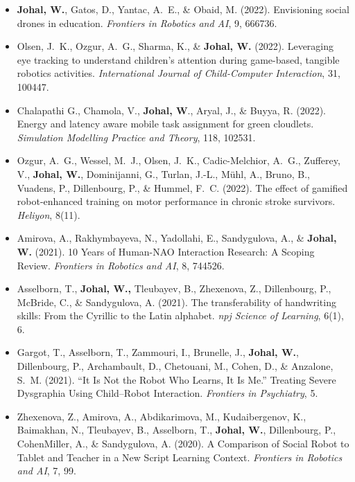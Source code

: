 \begin{itemize}[nosep]
    \item \textbf{Johal, W.}, Gatos, D., Yantac, A.\ E., \& Obaid, M. (2022). Envisioning social drones in education. \textit{Frontiers in Robotics and AI}, 9, 666736.

    \item Olsen, J.\ K., Ozgur, A.\ G., Sharma, K., \& \textbf{Johal, W.} (2022). Leveraging eye tracking to understand children's attention during game-based, tangible robotics activities. \textit{International Journal of Child-Computer Interaction}, 31, 100447.

    \item Chalapathi G., Chamola, V., \textbf{Johal, W}., Aryal, J., \& Buyya, R. (2022). Energy and latency aware mobile task assignment for green cloudlets. \textit{Simulation Modelling Practice and Theory}, 118, 102531.

    \item Ozgur, A.\ G., Wessel, M.\ J., Olsen, J.\ K., Cadic-Melchior, A.\ G., Zufferey, V., \textbf{Johal, W.}, Dominijanni, G., Turlan, J.-L., Mühl, A., Bruno, B., Vuadens, P., Dillenbourg, P., \& Hummel, F.\ C. (2022). The effect of gamified robot-enhanced training on motor performance in chronic stroke survivors. \textit{Heliyon}, 8(11).

    \item Amirova, A., Rakhymbayeva, N., Yadollahi, E., Sandygulova, A., \& \textbf{Johal, W.} (2021). 10 Years of Human-NAO Interaction Research: A Scoping Review. \textit{Frontiers in Robotics and AI}, 8, 744526.

    \item Asselborn, T., \textbf{Johal, W.,} Tleubayev, B., Zhexenova, Z., Dillenbourg, P., McBride, C., \& Sandygulova, A. (2021). The transferability of handwriting skills: From the Cyrillic to the Latin alphabet. \textit{npj Science of Learning}, 6(1), 6.

    \item Gargot, T., Asselborn, T., Zammouri, I., Brunelle, J., \textbf{Johal, W.}, Dillenbourg, P., Archambault, D., Chetouani, M., Cohen, D., \& Anzalone, S.\ M. (2021). ``It Is Not the Robot Who Learns, It Is Me.'' Treating Severe Dysgraphia Using Child--Robot Interaction. \textit{Frontiers in Psychiatry}, 5.

    \item Zhexenova, Z., Amirova, A., Abdikarimova, M., Kudaibergenov, K., Baimakhan, N., Tleubayev, B., Asselborn, T., \textbf{Johal, W.}, Dillenbourg, P., CohenMiller, A., \& Sandygulova, A. (2020). A Comparison of Social Robot to Tablet and Teacher in a New Script Learning Context. \textit{Frontiers in Robotics and AI}, 7, 99.


\end{itemize}
